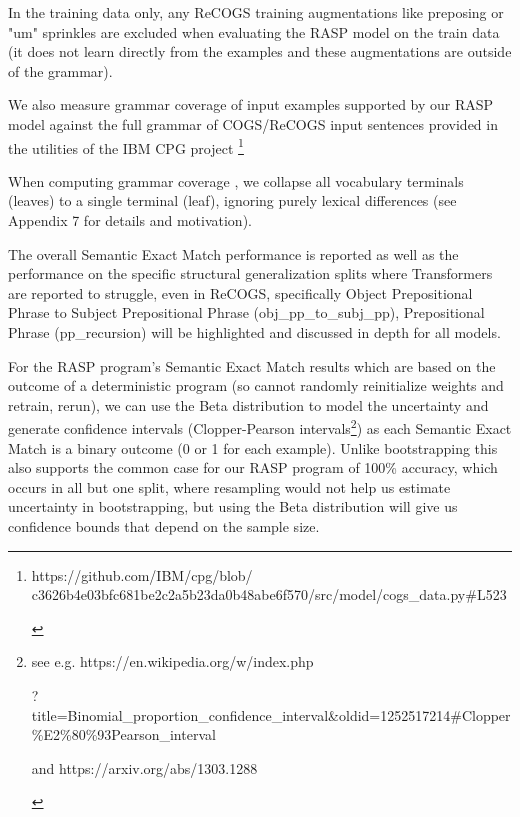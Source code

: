 \documentclass[11pt]{article}
\begin{document}

In the training data only, any ReCOGS training augmentations like preposing or "um" sprinkles are excluded when evaluating the RASP model on the train data (it does not learn directly from the examples and these augmentations are outside of the grammar). 

We also measure grammar coverage of input examples supported by our RASP model against the full grammar of COGS/ReCOGS input sentences provided in the utilities of the IBM CPG project \cite{klinger2024compositionalprogramgenerationfewshot}\footnote{
\begin{tiny}
https://github.com/IBM/cpg/blob/
c3626b4e03bfc681be2c2a5b23da0b48abe6f570/src/model/cogs\_data.py\#L523 
\end{tiny}
}

When computing grammar coverage \cite{fuzzingbook2023:GrammarCoverageFuzzer}, we collapse all vocabulary terminals (leaves) to a single terminal (leaf), ignoring purely lexical differences (see Appendix 7 for details and motivation).

The overall Semantic Exact Match performance is reported as well as the performance on the specific structural generalization splits where Transformers are reported to struggle, even in ReCOGS, specifically Object Prepositional Phrase to Subject Prepositional Phrase (obj\_pp\_to\_subj\_pp),
Prepositional Phrase (pp\_recursion) will be highlighted and discussed in depth for all models.

For the RASP program's Semantic Exact Match results which are based on the outcome of a deterministic program (so cannot randomly reinitialize weights and retrain, rerun),
we can use the Beta distribution to model the uncertainty and generate confidence intervals (Clopper-Pearson intervals\footnote{
\begin{tiny}
see e.g. 
https://en.wikipedia.org/w/index.php

?title=Binomial\_proportion\_confidence\_interval\&oldid=1252517214\#Clopper\%E2\%80\%93Pearson\_interval

and https://arxiv.org/abs/1303.1288 
\end{tiny}
}) as each Semantic Exact Match is a binary outcome (0 or 1 for each example). Unlike bootstrapping this also supports the common case for our RASP program of 100\% accuracy, which occurs in all but one split, where resampling would not help us estimate uncertainty in bootstrapping, but using the Beta distribution will give us confidence bounds that depend on the sample size.
\end{document}
